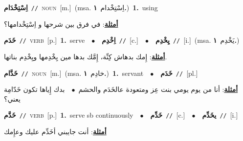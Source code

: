 \documentclass[10pt,a4paper,twoside]{article} %
\begin{document}
\begin{multicols}{2}
{\setlength\topsep{0pt}\textbf{\foreignlanguage{arabic}{اِسْتِخْدَام}}\ {\color{gray}\texttt{//}\color{black}}\ \textsc{noun}\ [m.]\ \color{gray}(msa. \foreignlanguage{arabic}{اِسْتِخْدام}~\foreignlanguage{arabic}{\textbf{١.}})\color{black}\ \textbf{1.}~using\  \begin{flushright}\color{gray}\foreignlanguage{arabic}{\textbf{\underline{\foreignlanguage{arabic}{أمثلة}}}: في فرق بين شرحها و اِسْتِخْدامها؟}\end{flushright}\color{black}} \vspace{2mm}

{\setlength\topsep{0pt}\textbf{\foreignlanguage{arabic}{خَدَم}}\ {\color{gray}\texttt{//}\color{black}}\ \textsc{verb}\ [p.]\ \textbf{1.}~serve\ \ $\bullet$\ \ \setlength\topsep{0pt}\textbf{\foreignlanguage{arabic}{اِخْدِم}}\ {\color{gray}\texttt{//}\color{black}}\ [c.]\ \ $\bullet$\ \ \setlength\topsep{0pt}\textbf{\foreignlanguage{arabic}{يِخْدِم}}\ {\color{gray}\texttt{//}\color{black}}\ [i.]\ \color{gray}(msa. \foreignlanguage{arabic}{يَخْدِم}~\foreignlanguage{arabic}{\textbf{١.}})\color{black}\  \begin{flushright}\color{gray}\foreignlanguage{arabic}{\textbf{\underline{\foreignlanguage{arabic}{أمثلة}}}: إِمك بدهاش كِنِّة، إِمَّك بدها مين يِخْدِمها ويِخْدِم بناتها.}\end{flushright}\color{black}} \vspace{2mm}

{\setlength\topsep{0pt}\textbf{\foreignlanguage{arabic}{خَدَّام}}\ {\color{gray}\texttt{//}\color{black}}\ \textsc{noun}\ [m.]\ \color{gray}(msa. \foreignlanguage{arabic}{خادِم}~\foreignlanguage{arabic}{\textbf{١.}})\color{black}\ \textbf{1.}~servant\ \ $\bullet$\ \ \setlength\topsep{0pt}\textbf{\foreignlanguage{arabic}{خَدَم}}\ {\color{gray}\texttt{//}\color{black}}\ [pl.]\  \begin{flushright}\color{gray}\foreignlanguage{arabic}{\textbf{\underline{\foreignlanguage{arabic}{أمثلة}}}: أنا من يوم يومي بنت عِز ومتعودة عالخَدَم والحشم\ $\bullet$\ \  بدك إِياها تكون خَدّامِة يعني؟}\end{flushright}\color{black}} \vspace{2mm}

{\setlength\topsep{0pt}\textbf{\foreignlanguage{arabic}{خَدَّم}}\ {\color{gray}\texttt{//}\color{black}}\ \textsc{verb}\ [p.]\ \textbf{1.}~serve sb continuously\ \ $\bullet$\ \ \setlength\topsep{0pt}\textbf{\foreignlanguage{arabic}{خَدِّم}}\ {\color{gray}\texttt{//}\color{black}}\ [c.]\ \ $\bullet$\ \ \setlength\topsep{0pt}\textbf{\foreignlanguage{arabic}{يخَدِّم}}\ {\color{gray}\texttt{//}\color{black}}\ [i.]\  \begin{flushright}\color{gray}\foreignlanguage{arabic}{\textbf{\underline{\foreignlanguage{arabic}{أمثلة}}}: أنت جايبني أخَدِّم عليك وعإِمك}\end{flushright}\color{black}} \vspace{2mm}


\end{multicols}
\end{document}
